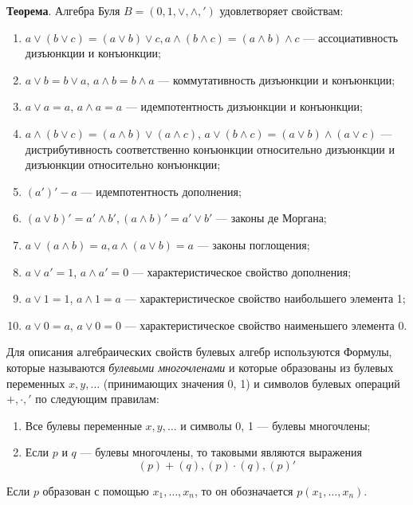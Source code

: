 \textbf{Теорема}. Алгебра Буля $B=({0,1},\lor,\land,')$ удовлетворяет свойствам:
\begin{enumerate}
    \item $a \lor (b \lor c) = (a \lor b) \lor c, a \land (b \land c) = (a \land b) \land c$ --- ассоциативность дизъюнкции и конъюнкции;
    \item $a \lor b = b \lor a$, $a \land b = b \land a$  --- коммутативность дизъюнкции и конъюнкции;
    \item $a \lor a = a$, $a \land a = a$ --- идемпотентность дизъюнкции и конъюнкции;
    \item $a \land (b \lor c) = (a \land b) \lor (a \land c)$, $a \lor (b \land c) = (a \lor b) \land (a \lor c)$ --- дистрибутивность соответственно конъюнкции относительно дизъюнкции и дизъюнкции относительно конъюнкции;
    \item $(a')' - a$ --- идемпотентность дополнения;
    \item $(a \lor b)' = a' \land b', (a \land b)' = a' \lor b'$ --- законы де Моргана;
    \item $a \lor (a \land b) = a, a \land (a \lor b) = a$ --- законы поглощения;
    \item $a \lor a' = 1$, $a \land a' = 0$ --- характеристическое свойство дополнения;
    \item $a \lor 1 = 1$, $a \land 1 = a$ --- характеристическое свойство наибольшего элемента 1;
    \item $a \lor 0 = a$, $a \lor 0 = 0$ --- характеристическое свойство наименьшего элемента 0.
\end{enumerate}

Для описания алгебраических свойств булевых алгебр используются Формулы, которые называются \textit{булевыми многочленами} и которые образованы из булевых переменных $x, y, \dots$ (принимающих значения 0, 1) и символов булевых операций $+, \cdot, '$ по следующим правилам:
\begin{enumerate}
    \item Все булевы переменные $x, y, \dots$ и символы 0, 1 --- булевы многочлены;
    \item Если $p$ и $q$ --- булевы многочлены, то таковыми являются выражения
    \begin{equation*}
        (p)+(q), (p) \cdot (q), (p)'
    \end{equation*}
\end{enumerate}

Если $p$ образован с помощью $x_1, \dots, x_n$, то он обозначается $p(x_1, \dots, x_n)$.

